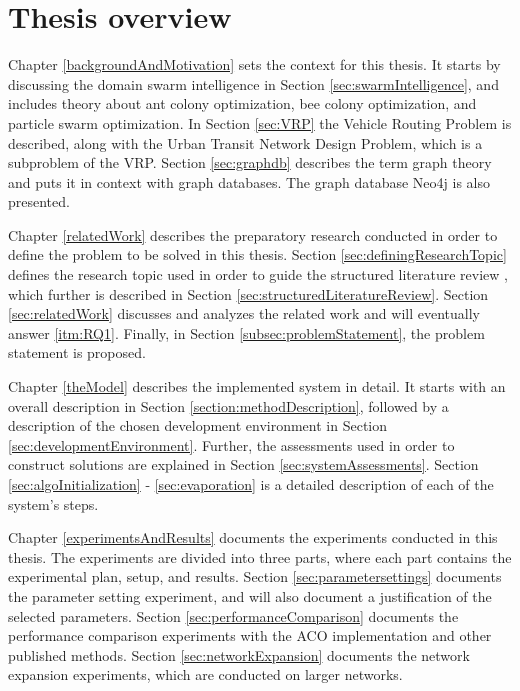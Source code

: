 \section{Thesis overview}



Chapter \ref{backgroundAndMotivation} sets the context for this thesis. It starts by discussing the domain swarm intelligence in Section \ref{sec:swarmIntelligence}, and includes theory about ant colony optimization, bee colony optimization, and particle swarm optimization. In Section \ref{sec:VRP} the Vehicle Routing Problem is described, along with the Urban Transit Network Design Problem, which is a subproblem of the VRP. Section \ref{sec:graphdb} describes the term graph theory and puts it in context with graph databases. The graph database Neo4j is also presented. 

Chapter \ref{relatedWork} describes the preparatory research conducted in order to define the problem to be solved in this thesis. Section \ref{sec:definingResearchTopic} defines the research topic used in order to guide the structured literature review \citep{kofod2014}, which further is described in Section \ref{sec:structuredLiteratureReview}. Section \ref{sec:relatedWork} discusses and analyzes the related work and will eventually answer \ref{itm:RQ1}. Finally, in Section \ref{subsec:problemStatement}, the problem statement is proposed.  

Chapter \ref{theModel} describes the implemented system in detail. It starts with an overall description in Section \ref{section:methodDescription}, followed by a description of the chosen development environment in Section \ref{sec:developmentEnvironment}. Further, the assessments used in order to construct solutions are explained in Section \ref{sec:systemAssessments}. Section \ref{sec:algoInitialization} - \ref{sec:evaporation} is a detailed description of each of the system's steps.

Chapter \ref{experimentsAndResults} documents the experiments conducted in this thesis. The experiments are divided into three parts, where each part contains the experimental plan, setup, and results. Section \ref{sec:parametersettings} documents the parameter setting experiment, and will also document a justification of the selected parameters. Section \ref{sec:performanceComparison} documents the performance comparison experiments with the ACO implementation and other published methods. Section \ref{sec:networkExpansion} documents the network expansion experiments, which are conducted on larger networks. 


